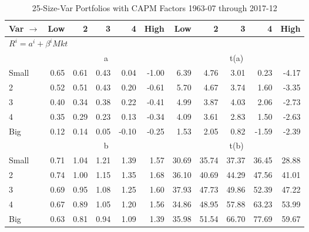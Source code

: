 
\begin{table}[!ht]
\footnotesize
\centering
\caption{25-Size-Var Portfolios with CAPM Factors 1963-07 through 2017-12}
\begin{tabular}{lrrrrrrrrrr}
  \toprule
    Var $\rightarrow$ & Low & 2 & 3 & 4 & High & Low & 2 & 3 & 4 & High \\ 
  \midrule
  \multicolumn{11}{l}{$R^i=a^i+\beta^iMkt$} \\

  
    
      & \multicolumn{5}{c}{a} & \multicolumn{5}{c}{t(a)}
    
    \\
      \cmidrule(r){2-6} \cmidrule(r){7-11}

    Small   & 0.65  & 0.61  & 0.43  & 0.04  & -1.00  & 6.39  & 4.76  & 3.01  & 0.23  & -4.17  \\
         2  & 0.52  & 0.51  & 0.43  & 0.20  & -0.61  & 5.70  & 4.67  & 3.74  & 1.60  & -3.35  \\
         3  & 0.40  & 0.34  & 0.38  & 0.22  & -0.41  & 4.99  & 3.87  & 4.03  & 2.06  & -2.73  \\
         4  & 0.35  & 0.29  & 0.23  & 0.13  & -0.34  & 4.09  & 3.61  & 2.83  & 1.50  & -2.63  \\
    Big     & 0.12  & 0.14  & 0.05  & -0.10  & -0.25  & 1.53  & 2.05  & 0.82  & -1.59  & -2.39  \\

  
    
      & \multicolumn{5}{c}{b} & \multicolumn{5}{c}{t(b)}
    
    \\
      \cmidrule(r){2-6} \cmidrule(r){7-11}

    Small   & 0.71  & 1.04  & 1.21  & 1.39  & 1.57  & 30.69  & 35.74  & 37.37  & 36.45  & 28.88  \\
         2  & 0.74  & 1.00  & 1.15  & 1.35  & 1.68  & 36.10  & 40.69  & 44.29  & 47.56  & 41.01  \\
         3  & 0.69  & 0.95  & 1.08  & 1.25  & 1.60  & 37.93  & 47.73  & 49.86  & 52.39  & 47.22  \\
         4  & 0.67  & 0.89  & 1.05  & 1.20  & 1.56  & 34.86  & 48.95  & 57.88  & 63.23  & 53.99  \\
    Big     & 0.63  & 0.81  & 0.94  & 1.09  & 1.39  & 35.98  & 51.54  & 66.70  & 77.69  & 59.67  \\

  

  \bottomrule
\end{tabular}
\label{tbl:25_Size_Var_CAPM}
\end{table}